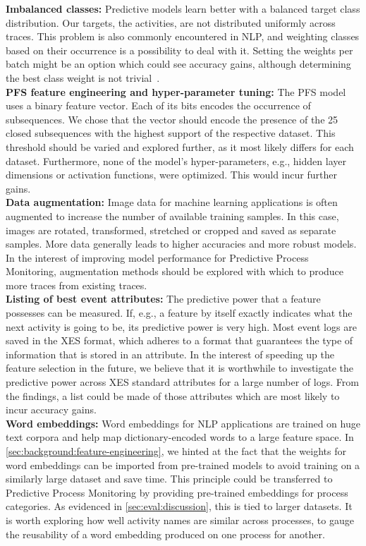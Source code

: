 \noindent\textbf{Imbalanced classes:} Predictive models learn better with a balanced target class distribution.
Our targets, the activities, are not distributed uniformly across traces.
This problem is also commonly encountered in NLP, and weighting classes based on their occurrence is a possibility to deal with it.
Setting the weights per batch might be an option which could see accuracy gains, although determining the best class weight is not trivial~\cite{web:stackoverflow-keras-class-weights}.\\

\noindent\textbf{PFS feature engineering and hyper-parameter tuning:} The PFS model uses a binary feature vector.
Each of its bits encodes the occurrence of subsequences.
We chose that the vector should encode the presence of the 25 closed subsequences with the highest support of the respective dataset.
This threshold should be varied and explored further, as it most likely differs for each dataset.
Furthermore, none of the model's hyper-parameters, e.g., hidden layer dimensions or activation functions, were optimized.
This would incur further gains.\\

\noindent\textbf{Data augmentation:} Image data for machine learning applications is often augmented to increase the number of available training samples.
In this case, images are rotated, transformed, stretched or cropped and saved as separate samples.
More data generally leads to higher accuracies and more robust models.
In the interest of improving model performance for Predictive Process Monitoring, augmentation methods should be explored with which to produce more traces from existing traces.\\

\noindent\textbf{Listing of best event attributes:} The predictive power that a feature possesses can be measured.
If, e.g., a feature by itself exactly indicates what the next activity is going to be, its predictive power is very high.
Most event logs are saved in the XES format, which adheres to a format that guarantees the type of information that is stored in an attribute.
In the interest of speeding up the feature selection in the future, we believe that it is worthwhile to investigate the predictive power across XES standard attributes for a large number of logs.
From the findings, a list could be made of those attributes which are most likely to incur accuracy gains.
\\

\noindent\textbf{Word embeddings:}
Word embeddings for NLP applications are trained on huge text corpora and help map dictionary-encoded words to a large feature space.
In \autoref{sec:background:feature-engineering}, we hinted at the fact that the weights for word embeddings can be imported from pre-trained models to avoid training on a similarly large dataset and save time.
This principle could be transferred to Predictive Process Monitoring by providing pre-trained embeddings for process categories.
As evidenced in \autoref{sec:eval:discussion}, this is tied to larger datasets.
It is worth exploring how well activity names are similar across processes, to gauge the reusability of a word embedding produced on one process for another.
